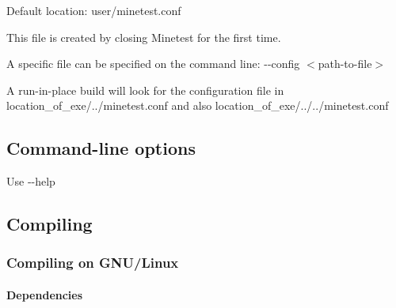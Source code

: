 \begin{DoxyItemize}
\item Default location\+: {\ttfamily user/minetest.\+conf}
\item This file is created by closing Minetest for the first time.
\item A specific file can be specified on the command line\+: {\ttfamily -\/-\/config $<$path-\/to-\/file$>$}
\item A run-\/in-\/place build will look for the configuration file in {\ttfamily location\+\_\+of\+\_\+exe/../minetest.conf} and also {\ttfamily location\+\_\+of\+\_\+exe/../../minetest.conf}
\end{DoxyItemize}

\subsection*{Command-\/line options }


\begin{DoxyItemize}
\item Use {\ttfamily -\/-\/help}
\end{DoxyItemize}

\subsection*{Compiling }

\subsubsection*{Compiling on G\+N\+U/\+Linux}

\paragraph*{Dependencies}

